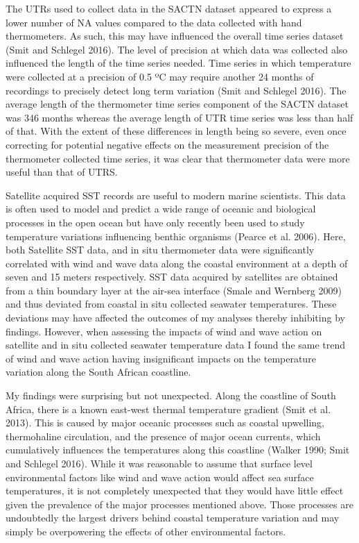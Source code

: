 \documentclass[12pt,]{article}
\begin{document}
The UTRs used to collect data in the SACTN dataset appeared to express a
lower number of NA values compared to the data collected with hand
thermometers. As such, this may have influenced the overall time series
dataset (Smit and Schlegel 2016). The level of precision at which data
was collected also influenced the length of the time series needed. Time
series in which temperature were collected at a precision of 0.5 ºC may
require another 24 months of recordings to precisely detect long term
variation (Smit and Schlegel 2016). The average length of the
thermometer time series component of the SACTN dataset was 346 months
whereas the average length of UTR time series was less than half of
that. With the extent of these differences in length being so severe,
even once correcting for potential negative effects on the measurement
precision of the thermometer collected time series, it was clear that
thermometer data were more useful than that of UTRS.

Satellite acquired SST records are useful to modern marine scientists.
This data is often used to model and predict a wide range of oceanic and
biological processes in the open ocean but have only recently been used
to study temperature variations influencing benthic organisms (Pearce et
al. 2006). Here, both Satellite SST data, and in situ thermometer data
were significantly correlated with wind and wave data along the coastal
environment at a depth of seven and 15 meters respectively. SST data
acquired by satellites are obtained from a thin boundary layer at the
air-sea interface (Smale and Wernberg 2009) and thus deviated from
coastal in situ collected seawater temperatures. These deviations may
have affected the outcomes of my analyses thereby inhibiting by
findings. However, when assessing the impacts of wind and wave action on
satellite and in situ collected seawater temperature data I found the
same trend of wind and wave action having insignificant impacts on the
temperature variation along the South African coastline.

My findings were surprising but not unexpected. Along the coastline of
South Africa, there is a known east-west thermal temperature gradient
(Smit et al. 2013). This is caused by major oceanic processes such as
coastal upwelling, thermohaline circulation, and the presence of major
ocean currents, which cumulatively influences the temperatures along
this coastline (Walker 1990; Smit and Schlegel 2016). While it was
reasonable to assume that surface level environmental factors like wind
and wave action would affect sea surface temperatures, it is not
completely unexpected that they would have little effect given the
prevalence of the major processes mentioned above. Those processes are
undoubtedly the largest drivers behind coastal temperature variation and
may simply be overpowering the effects of other environmental factors.
\end{document}
